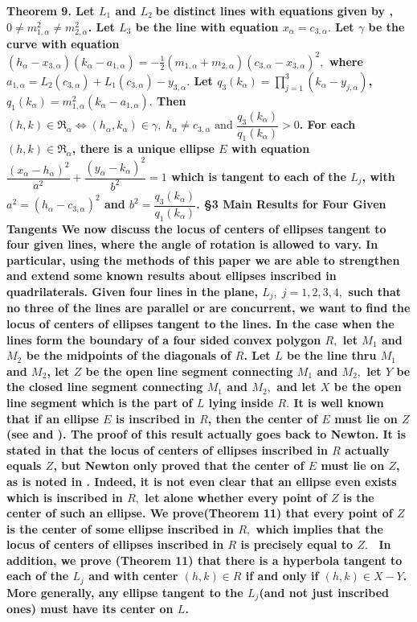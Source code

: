 \bf Theorem 9. \rm  Let $L_{1}$ and $L_{2}\;$be distinct lines with equations given by , $0\neq m_{1,\alpha }^{2}\neq m_{2,\alpha }^{2}$. Let $L_{3}$ be the line with equation $x_{\alpha }=c_{3,\alpha }.$ Let $\gamma $ be the curve with equation \newline $(h_{\alpha }-x_{3,\alpha })(k_{\alpha }-a_{1,\alpha })=-\frac{1}{2}\left( m_{1,\alpha }+m_{2,\alpha }\right) (c_{3,\alpha }-x_{3,\alpha })^{2},$ where  \newline $a_{1,\alpha }=L_{2}(c_{3,\alpha })+L_{1}(c_{3,\alpha })-y_{3,\alpha }.$ Let $q_{3}(k_{\alpha })=\prod\limits_{j=1}^{3}(k_{\alpha }-y_{j,\alpha })$, \newline $q_{1}(k_{\alpha })=m_{1,\alpha }^{2}(k_{\alpha }-a_{1,\alpha }).$ Then $(h,k)\in \Re _{\alpha }\Leftrightarrow (h_{\alpha },k_{\alpha })\in \gamma ,\;h_{\alpha }\neq c_{3,\alpha }\text{ and }\dfrac{q_{3}(k_{\alpha })}{q_{1}(k_{\alpha })}>0$. For each $(h,k)\in \Re _{\alpha }$, there is a unique ellipse $E$ with equation $\dfrac{(x_{\alpha }-h_{\alpha })^{2}}{a^{2}}+\dfrac{(y_{\alpha }-k_{\alpha })^{2}}{b^{2}}=1$ which is tangent to each of the $L_{j}$, with $a^{2}=(h_{\alpha }-c_{3,\alpha })^{2}$ and $b^{2}=\dfrac{q_{3}(k_{\alpha })}{q_{1}(k_{\alpha })}$. \newline \nl
\bf \S 3 Main Results for Four Given Tangents \rm \newline	
	We now discuss the locus of centers of ellipses tangent to \bf four \rm given lines, where the angle of rotation is allowed to vary. In particular, using the methods of this paper we are able to strengthen and extend some known results about ellipses inscribed in quadrilaterals. Given four lines in the plane, $L_{j},\;j=1,2,3,4,$ such that no three of the lines are parallel or are concurrent, we want to find the locus of centers of ellipses tangent to the lines. In the case when the lines form the boundary of a four sided convex polygon $R,$ let $M_{1}$ and $M_{2}$ be the midpoints of the diagonals of $R$. Let $L$ be the line thru $M_{1}$ and $M_{2}$, let $Z$ be the open line segment connecting $M_{1}$ and $M_{2},$ let $Y$ be the \bf closed \rm line segment connecting $M_{1}$ and $M_{2},$ and let $X$ be the open line segment which is the part of $L$ lying inside $R.$ It is well known that if an ellipse $E$ is \bf inscribed \rm in $R$, then the center of $E$ must lie on $Z$(see \cite{1} and \cite{2}). The proof of this result actually goes back to Newton. It is stated in \cite{2} that the locus of centers of ellipses inscribed in $R$ actually \bf equals \rm $Z$, but Newton only proved that the center of $E$ must lie on $Z$, as is noted in \cite{1}. Indeed, it is not even clear that an ellipse even \bf exists \rm which is inscribed in $R,$ let alone whether \bf every point \rm of $Z$ is the center of such an ellipse. We prove(Theorem 11) that every point of $Z$ is the center of some ellipse inscribed in $R,$ which implies that the locus of centers of ellipses inscribed in $R$ is precisely equal to $Z.$ \ In addition, we prove (Theorem 11) that there is a hyperbola tangent to each of the $L_{j}$ and with center $(h,k)\in R$ if and only if $(h,k)\in X-Y$. More generally, any ellipse tangent to the $L_{j}$(and not just inscribed ones) must have its center on $L$. \nl \nl 
